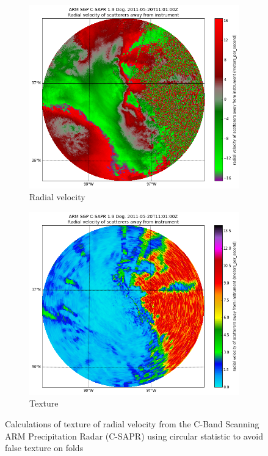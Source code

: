 \documentclass[twocol]{ametsoc}
\begin{document}
\begin{figure}[h]
    \centering
    \begin{subfigure}[b]{0.4\columnwidth}
        \includegraphics[width=\columnwidth]{radial_velocity.png}
        \caption{Radial velocity}
        \label{fig:textcalc:vr}
    \end{subfigure}
    \begin{subfigure}[b]{0.4\columnwidth}
        \includegraphics[width=\columnwidth]{texture.png}
        \caption{Texture}
        \label{fig:textcalc:tx}
    \end{subfigure}
    \caption{Calculations of texture of radial velocity from the C-Band Scanning ARM Precipitation Radar (C-SAPR) using circular statistic to avoid false texture on folds}
\end{figure}
\end{document}
